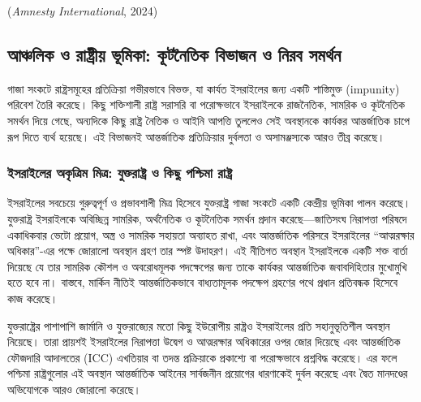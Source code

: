 (\emph{Amnesty International}, 2024)

\vspace{0.3em}

\subsection{আঞ্চলিক ও রাষ্ট্রীয় ভূমিকা: কূটনৈতিক বিভাজন ও নিরব
সমর্থন}\label{ux986ux99eux99aux9b2ux995-ux993-ux9b0ux9b7ux99fux9b0ux9df-ux9adux9aeux995-ux995ux99fux9a8ux9a4ux995-ux9acux9adux99cux9a8-ux993-ux9a8ux9b0ux9ac-ux9b8ux9aeux9b0ux9a5ux9a8}

গাজা সংকটে রাষ্ট্রসমূহের প্রতিক্রিয়া গভীরভাবে বিভক্ত, যা কার্যত ইসরাইলের জন্য
একটি শাস্তিমুক্ত (impunity) পরিবেশ তৈরি করেছে। কিছু শক্তিশালী রাষ্ট্র সরাসরি বা
পরোক্ষভাবে ইসরাইলকে রাজনৈতিক, সামরিক ও কূটনৈতিক সমর্থন দিয়ে গেছে, অন্যদিকে
কিছু রাষ্ট্র নৈতিক ও আইনি আপত্তি তুললেও সেই অবস্থানকে কার্যকর আন্তর্জাতিক চাপে রূপ
দিতে ব্যর্থ হয়েছে। এই বিভাজনই আন্তর্জাতিক প্রতিক্রিয়ার দুর্বলতা ও অসামঞ্জস্যকে আরও
তীব্র করেছে।

\subsubsection{ইসরাইলের অকৃত্রিম মিত্র: যুক্তরাষ্ট্র ও কিছু পশ্চিমা
রাষ্ট্র}\label{ux987ux9b8ux9b0ux987ux9b2ux9b0-ux985ux995ux9a4ux9b0ux9ae-ux9aeux9a4ux9b0-ux9afux995ux9a4ux9b0ux9b7ux99fux9b0-ux993-ux995ux99b-ux9aaux9b6ux99aux9ae-ux9b0ux9b7ux99fux9b0}

ইসরাইলের সবচেয়ে গুরুত্বপূর্ণ ও প্রভাবশালী মিত্র হিসেবে যুক্তরাষ্ট্র গাজা সংকটে একটি
কেন্দ্রীয় ভূমিকা পালন করেছে। যুক্তরাষ্ট্র ইসরাইলকে অবিচ্ছিন্ন সামরিক, অর্থনৈতিক ও
কূটনৈতিক সমর্থন প্রদান করেছে---জাতিসংঘ নিরাপত্তা পরিষদে একাধিকবার ভেটো
প্রয়োগ, অস্ত্র ও সামরিক সহায়তা অব্যাহত রাখা, এবং আন্তর্জাতিক পরিসরে ইসরাইলের
``আত্মরক্ষার অধিকার''-এর পক্ষে জোরালো অবস্থান গ্রহণ তার স্পষ্ট উদাহরণ। এই
নীতিগত অবস্থান ইসরাইলকে একটি শক্ত বার্তা দিয়েছে যে তার সামরিক কৌশল ও
অবরোধমূলক পদক্ষেপের জন্য তাকে কার্যকর আন্তর্জাতিক জবাবদিহিতার মুখোমুখি হতে হবে
না। বাস্তবে, মার্কিন নীতিই আন্তর্জাতিকভাবে বাধ্যতামূলক পদক্ষেপ গ্রহণের পথে প্রধান
প্রতিবন্ধক হিসেবে কাজ করেছে।

যুক্তরাষ্ট্রের পাশাপাশি জার্মানি ও যুক্তরাজ্যের মতো কিছু ইউরোপীয় রাষ্ট্রও ইসরাইলের
প্রতি সহানুভূতিশীল অবস্থান নিয়েছে। তারা প্রায়শই ইসরাইলের নিরাপত্তা উদ্বেগ ও
আত্মরক্ষার অধিকারের ওপর জোর দিয়েছে এবং আন্তর্জাতিক ফৌজদারি আদালতের (ICC)
এখতিয়ার বা তদন্ত প্রক্রিয়াকে প্রকাশ্যে বা পরোক্ষভাবে প্রশ্নবিদ্ধ করেছে। এর ফলে
পশ্চিমা রাষ্ট্রগুলোর এই অবস্থান আন্তর্জাতিক আইনের সার্বজনীন প্রয়োগের ধারণাকেই
দুর্বল করেছে এবং দ্বৈত মানদণ্ডের অভিযোগকে আরও জোরালো করেছে।

